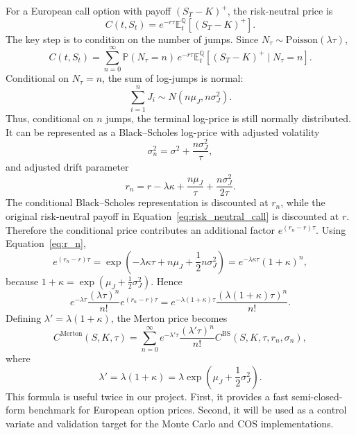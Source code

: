 \documentclass[12pt]{article}
\begin{document}
For a European call option with payoff $(S_T-K)^+$, the risk-neutral price is
\begin{equation}
C(t,S_t)=e^{-r\tau}\mathbb{E}_t^{\mathbb{Q}}[(S_T-K)^+].
\label{eq:risk_neutral_call}
\end{equation}
The key step is to condition on the number of jumps. Since $N_\tau\sim \mathrm{Poisson}(\lambda\tau)$,
\begin{equation}
C(t,S_t)=\sum_{n=0}^{\infty}\mathbb{P}(N_\tau=n)\,
 e^{-r\tau}\mathbb{E}_t^{\mathbb{Q}}[(S_T-K)^+\mid N_\tau=n].
\label{eq:condition_on_n}
\end{equation}
Conditional on $N_\tau=n$, the sum of log-jumps is normal:
\begin{equation}
\sum_{i=1}^{n}J_i\sim N(n\mu_J,n\sigma_J^2).
\end{equation}
Thus, conditional on $n$ jumps, the terminal log-price is still normally distributed. It can be represented as a Black--Scholes log-price with adjusted volatility
\begin{equation}
\sigma_n^2=\sigma^2+\frac{n\sigma_J^2}{\tau},
\label{eq:sigma_n}
\end{equation}
and adjusted drift parameter
\begin{equation}
r_n=r-\lambda\kappa+\frac{n\mu_J}{\tau}+\frac{n\sigma_J^2}{2\tau}.
\label{eq:r_n}
\end{equation}
The conditional Black--Scholes representation is discounted at $r_n$, while the original risk-neutral payoff in Equation~\eqref{eq:risk_neutral_call} is discounted at $r$. Therefore the conditional price contributes an additional factor $e^{(r_n-r)\tau}$. Using Equation~\eqref{eq:r_n},
\begin{equation}
e^{(r_n-r)\tau}
=\exp\left(-\lambda\kappa\tau+n\mu_J+\frac12n\sigma_J^2\right)
=e^{-\lambda\kappa\tau}(1+\kappa)^n,
\label{eq:rn_adjustment}
\end{equation}
because $1+\kappa=\exp(\mu_J+\frac12\sigma_J^2)$. Hence
\begin{equation}
e^{-\lambda\tau}\frac{(\lambda\tau)^n}{n!}e^{(r_n-r)\tau}
=
e^{-\lambda(1+\kappa)\tau}
\frac{(\lambda(1+\kappa)\tau)^n}{n!}.
\label{eq:lambda_prime_derivation}
\end{equation}
Defining $\lambda'=\lambda(1+\kappa)$, the Merton price becomes
\begin{equation}
C^{\mathrm{Merton}}(S,K,\tau)
=\sum_{n=0}^{\infty}
e^{-\lambda'\tau}\frac{(\lambda'\tau)^n}{n!}
C^{\mathrm{BS}}(S,K,\tau,r_n,\sigma_n),
\label{eq:merton_price_formula}
\end{equation}
where
\begin{equation}
\lambda'=\lambda(1+\kappa)=\lambda\exp\left(\mu_J+\frac12\sigma_J^2\right).
\label{eq:lambda_prime}
\end{equation}
This formula is useful twice in our project. First, it provides a fast semi-closed-form benchmark for European option prices. Second, it will be used as a control variate and validation target for the Monte Carlo and COS implementations.
\end{document}
